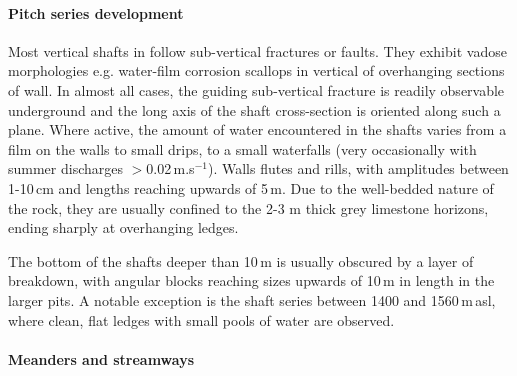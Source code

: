 \paragraph{Pitch series development}
Most vertical shafts in  follow sub-vertical fractures or faults. 
They exhibit vadose morphologies e.g. water-film corrosion scallops in vertical of overhanging sections of wall. 
In almost all cases, the guiding sub-vertical fracture is readily observable underground and the long axis of the shaft cross-section is oriented along such a plane. 
Where active, the amount of water encountered in the shafts varies from a film on the walls to small drips, to a small waterfalls (very occasionally with summer discharges $>$0.02\,m.s$^{-1}$).
Walls flutes and rills, with amplitudes between 1-10\,cm and lengths reaching upwards of 5\,m. 
Due to the well-bedded nature of the rock, they are usually confined to the 2-3 m thick grey limestone horizons, ending sharply at overhanging ledges. 

The bottom of the shafts deeper than 10\,m is usually obscured by a layer of breakdown, with angular blocks reaching sizes upwards of 10\,m in length in the larger pits.
A notable exception is the  shaft series between 1400 and 1560\,m\,asl, where clean, flat ledges with small pools of water are observed. 



\paragraph{Meanders and streamways}

